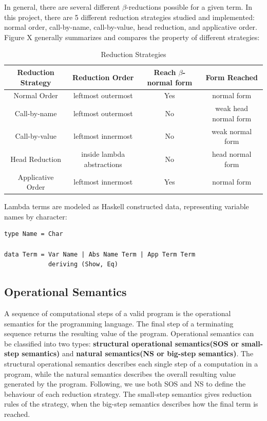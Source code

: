 In general, there are several different $\beta$-reductions possible for a given term. In this project, there are 5 different reduction strategies studied and implemented: normal order, call-by-name, call-by-value, head reduction, and applicative order. Figure X generally summarizes and compares the property of different strategies:
 
\begin{center}
\begin{table}[ht!]
\begin{tabular}{|c|c|c|c|}\hline
Reduction Strategy & Reduction Order & Reach $\beta$-normal form & Form Reached\\ \hline
Normal Order & leftmost outermost & Yes & normal form\\ \hline
Call-by-name & leftmost outermost & No  & weak head normal form\\ \hline
Call-by-value & leftmost innermost & No & weak normal form\\ \hline
Head Reduction & inside lambda abstractions & No & head normal form\\ \hline
Applicative Order & leftmost innermost & Yes & normal form\\ \hline
\end{tabular}
\caption{Reduction Strategies}
\end{table}
\end{center}

Lambda terms are modeled as Haskell constructed data, representing variable names by character:

\begin{verbatim}
type Name = Char  

data Term = Var Name | Abs Name Term | App Term Term
            deriving (Show, Eq)
\end{verbatim}


\subsection*{Operational Semantics}

A sequence of computational steps of a valid program is the operational semantics for the programming language. The final step of a terminating sequence returns the resulting value of the program. Operational semantics can be classified into two types: \textbf{structural operational semantics(SOS or small-step semantics)} and \textbf{natural semantics(NS or big-step semantics)}. The structural operational semantics describes each single step of a computation in a program, while the natural semantics describes the overall resulting value generated by the program. Following, we use both SOS and NS to define the behaviour of each reduction strategy. The small-step semantics gives reduction rules of the strategy, when the big-step semantics describes how the final term is reached.  

